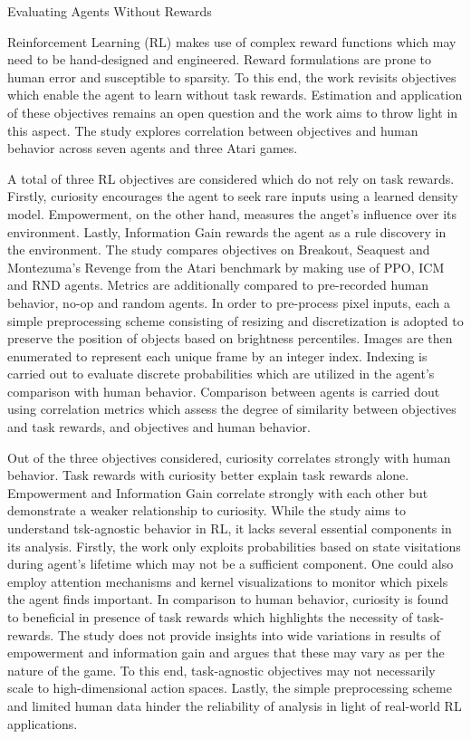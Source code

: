 \documentclass[12pt,letterpaper]{article}
\begin{document}
\begin{center}
  \large{Evaluating Agents Without Rewards}
\end{center}

Reinforcement Learning (RL) makes use of complex reward functions which may need to be hand-designed and engineered. Reward formulations are prone to human error and susceptible to sparsity. To this end, the work revisits objectives which enable the agent to learn without task rewards. Estimation and application of these objectives remains an open question and the work aims to throw light in this aspect. The study explores correlation between objectives and human behavior across seven agents and three Atari games.

A total of three RL objectives are considered which do not rely on task rewards. Firstly, curiosity encourages the agent to seek rare inputs using a learned density model. Empowerment, on the other hand, measures the anget's influence over its environment. Lastly, Information Gain rewards the agent as a rule discovery in the environment. The study compares objectives on Breakout, Seaquest and Montezuma's Revenge from the Atari benchmark by making use of PPO, ICM and RND agents. Metrics are additionally compared to pre-recorded human behavior, no-op and random agents. In order to pre-process pixel inputs, each a simple preprocessing scheme consisting of resizing and discretization is adopted to preserve the position of objects based on brightness percentiles. Images are then enumerated to represent each unique frame by an integer index. Indexing is carried out to evaluate discrete probabilities which are utilized in the agent's comparison with human behavior. Comparison between agents is carried dout using correlation metrics which assess the degree of similarity between objectives and task rewards, and objectives and human behavior. 

Out of the three objectives considered, curiosity correlates strongly with human behavior. Task rewards with curiosity better explain task rewards alone. Empowerment and Information Gain correlate strongly with each other but demonstrate a weaker relationship to curiosity. While the study aims to understand tsk-agnostic behavior in RL, it lacks several essential components in its analysis. Firstly, the work only exploits probabilities based on state visitations during agent's lifetime which may not be a sufficient component. One could also employ attention mechanisms and kernel visualizations to monitor which pixels the agent finds important. In comparison to human behavior, curiosity is found to beneficial in presence of task rewards which highlights the necessity of task-rewards. The study does not provide insights into wide variations in results of empowerment and information gain and argues that these may vary as per the nature of the game. To this end, task-agnostic objectives may not necessarily scale to high-dimensional action spaces. Lastly, the simple preprocessing scheme and limited human data hinder the reliability of analysis in light of real-world RL applications. 
\end{document}
